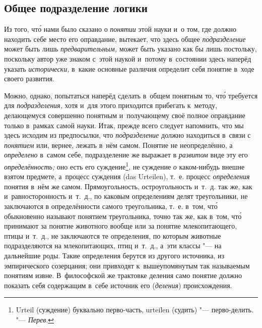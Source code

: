 \subsection[\hspace{8mm}Общее подразделение логики]{Общее подразделение логики}
Из того, чт\'{о} нами было сказано о
{\em понятии} этой науки и~о том, где должно находить
себе место его оправдание, вытекает, что здесь общее
{\em подразделение} может быть лишь
{\em предварительным,} может быть указано как бы лишь
постольку, поскольку автор уже знаком с~этой наукой и~потому в~состоянии
здесь наперёд указать {\em исторически,} в~какие
основные различия определит себя понятие в~ходе своего развития.

Можно, однако, попытаться наперёд сделать в~общем понятным то, чт\'{о} требуется
для {\em подразделения,} хотя и~для этого приходится
прибегать к~методу, делающемуся совершенно понятным и~получающему своё
полное оправдание только в~рамках самой науки. Итак, прежде всего следует
напомнить, что мы здесь исходим из предпосылки, что
{\em подразделение} должно находиться в~связи с
{\em понятием} или, вернее, лежать в~нём самом. Понятие
не неопределённо, а {\em определено} в~самом себе,
подразделение же выражает в {\em развитом} виде эту его
{\em определённость;} оно есть его суждение\footnote{
Urteil (суждение) буквально перво-часть, urteilen (судить) "--- перво-делить.
"--- {\em Перев}.}, не суждение {\em о} каком-нибудь
внешне взятом предмете, а~процесс суждения (das Urteilen), т.~е. процесс
{\em определения} понятия в~нём же самом.
Прямоугольность, остроугольность и~т.~д. так же, как и~равносторонность
и~т.~д., по каковым определениям делят треугольники, не заключаются в
определённости самого треугольника, т.~е. в~том, чт\'{о} обыкновенно называют
понятием треугольника, точно так же, как в~том, чт\'{о} принимают за понятие
животного вообще или за понятие млекопитающего, птицы и~т.~д., не
заключаются те определения, по которым животные подразделяются на
млекопитающих, птиц и~т.~д., а~эти классы "--- на дальнейшие роды. Такие
определения берутся из другого источника, из эмпирического созерцания; они
привходят к~вышеупомянутым так называемым понятиям извне. В~философской же
трактовке деления само понятие должно показать себя содержащим в~себе
источник его ({\em деления}) происхождения.


